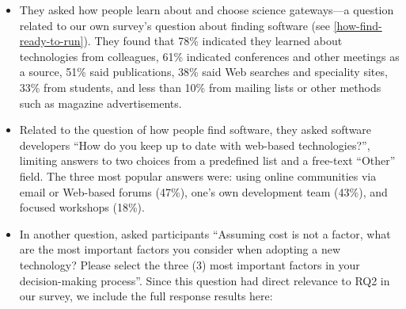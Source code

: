 \documentclass[review]{elsarticle}
\begin{document}
\begin{itemize}


\item They asked how people learn about and choose science gateways---a question related to our own survey's question about finding software (see \ref{how-find-ready-to-run}).  They found that 78\% indicated they learned about technologies from colleagues, 61\% indicated conferences and other meetings as a source, 51\% said publications, 38\% said Web searches and speciality sites, 33\% from students, and less than 10\% from mailing lists or other methods such as magazine advertisements.


\item Related to the question of how people find software, they asked software developers ``How do you keep up to date with web-based technologies?'', limiting answers to two choices from a predefined list and a free-text ``Other'' field.  The three most popular answers were: using online communities via email or Web-based forums (47\%), one's own development team (43\%), and focused workshops (18\%).

\item In another question, \citet{lawrence2015science} asked participants ``Assuming cost is not a factor, what are the most important factors you consider when adopting a new technology? Please select the three (3) most important factors in your decision-making process''.  Since this question had direct relevance to RQ2 in our survey, we include the full response results here:


\end{itemize}
\end{document}

